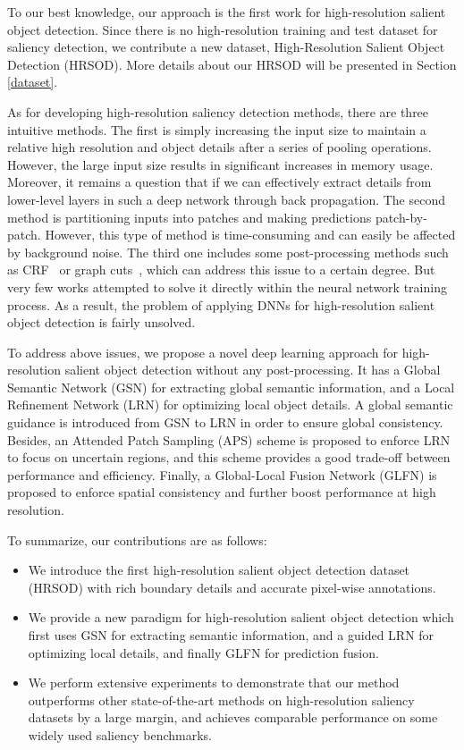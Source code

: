 \documentclass[10pt,twocolumn,letterpaper]{article}
\begin{document}
To our best knowledge, our approach is the first work for high-resolution salient object detection. Since there is no high-resolution training and test dataset for saliency detection, we contribute a new dataset, High-Resolution Salient Object Detection (HRSOD). More details about our HRSOD will be presented in Section \ref{dataset}.

As for developing high-resolution saliency detection methods, there are three intuitive methods. The first is simply increasing the input size to maintain a relative high resolution and object details after a series of pooling operations.
However, the large input size results in significant increases in memory usage. Moreover, it remains a question that if we can effectively extract details from lower-level layers in such a deep network through back propagation. The second method is partitioning inputs into patches and making predictions patch-by-patch. However, this type of method is time-consuming and can easily be affected by background noise. The third one includes some post-processing methods such as CRF~\cite{krahenbuhl2011efficient} or graph cuts~\cite{rother2004grabcut}, which can address this issue to a certain degree. But very few works attempted to solve it directly within the neural network training process. As a result, the problem of applying DNNs for high-resolution salient object detection is fairly unsolved.

To address above issues, we propose a novel deep learning approach for high-resolution salient object detection without any post-processing.
It has a Global Semantic Network (GSN) for extracting global semantic information, and a Local Refinement Network (LRN) for optimizing local object details.
A global semantic guidance is introduced from GSN to LRN in order to ensure global consistency. Besides, an Attended Patch Sampling (APS) scheme is proposed to enforce LRN to focus on uncertain regions, and this scheme provides a good trade-off between performance and efficiency. Finally, a Global-Local Fusion Network (GLFN) is proposed to enforce spatial consistency and further boost performance at high resolution.

To summarize, our contributions are as follows:
\begin{itemize}
\item
We introduce the first high-resolution salient object detection dataset (HRSOD) with rich boundary details and accurate pixel-wise annotations.
\item
We provide a new paradigm for high-resolution salient object detection which first uses GSN for extracting semantic information, and a guided LRN for optimizing local details, and finally GLFN for prediction fusion.
\item
We perform extensive experiments to demonstrate that our method outperforms other state-of-the-art methods on high-resolution saliency datasets by a large margin, and achieves comparable performance on some widely used saliency benchmarks.
\end{itemize}
\end{document}
